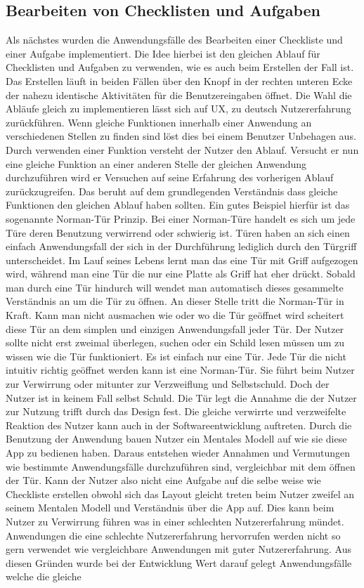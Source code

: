 \subsection{Bearbeiten von Checklisten und Aufgaben}\label{subsec:bearbeiten}

Als nächstes wurden die Anwendungsfälle des Bearbeiten einer Checkliste und einer Aufgabe implementiert. Die Idee hierbei ist den gleichen Ablauf für Checklisten und Aufgaben zu verwenden, wie es auch beim Erstellen der Fall ist. Das Erstellen läuft in beiden Fällen über den Knopf in der rechten unteren Ecke der nahezu identische Aktivitäten für die Benutzereingaben öffnet. Die Wahl die Abläufe gleich zu implementieren lässt sich auf \ac{UX}, zu deutsch Nutzererfahrung zurückführen. Wenn gleiche Funktionen innerhalb einer Anwendung an verschiedenen Stellen zu finden sind löst dies bei einem Benutzer Unbehagen aus. Durch verwenden einer Funktion versteht der Nutzer den Ablauf. Versucht er nun eine gleiche Funktion an einer anderen Stelle der gleichen Anwendung durchzuführen wird er Versuchen auf seine Erfahrung des vorherigen Ablauf zurückzugreifen. Das beruht auf dem grundlegenden Verständnis dass gleiche Funktionen den gleichen Ablauf haben sollten. Ein gutes Beispiel hierfür ist das sogenannte Norman-Tür Prinzip. Bei einer Norman-Türe handelt es sich um jede Türe deren Benutzung verwirrend oder schwierig ist. Türen haben an sich einen einfach Anwendungsfall der sich in der Durchführung lediglich durch den Türgriff unterscheidet. Im Lauf seines Lebens lernt man das eine Tür mit Griff aufgezogen wird, während man eine Tür die nur eine Platte als Griff hat eher drückt. Sobald man durch eine Tür hindurch will wendet man automatisch dieses gesammelte Verständnis an um die Tür zu öffnen. An dieser Stelle tritt die Norman-Tür in Kraft. Kann man nicht ausmachen wie oder wo die Tür geöffnet wird scheitert diese Tür an dem simplen und einzigen Anwendungsfall jeder Tür. Der Nutzer sollte nicht erst zweimal überlegen, suchen oder ein Schild lesen müssen um zu wissen wie die Tür funktioniert. Es ist einfach nur eine Tür. Jede Tür die nicht intuitiv richtig geöffnet werden kann ist eine Norman-Tür. Sie führt beim Nutzer zur Verwirrung oder mitunter zur Verzweiflung und Selbstschuld. Doch der Nutzer ist in keinem Fall selbst Schuld. Die Tür legt die Annahme die der Nutzer zur Nutzung trifft durch das Design fest. Die gleiche verwirrte und verzweifelte Reaktion des Nutzer kann auch in der Softwareentwicklung auftreten. Durch die Benutzung der Anwendung bauen Nutzer ein Mentales Modell auf wie sie diese App zu bedienen haben. Daraus entstehen wieder Annahmen und Vermutungen wie bestimmte Anwendungsfälle durchzuführen sind, vergleichbar mit dem öffnen der Tür. Kann der Nutzer also nicht eine Aufgabe auf die selbe weise wie Checkliste erstellen obwohl sich das Layout gleicht treten beim Nutzer zweifel an seinem Mentalen Modell und Verständnis über die App auf. Dies kann beim Nutzer zu Verwirrung führen was in einer schlechten Nutzererfahrung mündet. Anwendungen die eine schlechte Nutzererfahrung hervorrufen werden nicht so gern verwendet wie vergleichbare Anwendungen mit guter Nutzererfahrung. Aus diesen Gründen wurde bei der Entwicklung Wert darauf gelegt Anwendungsfälle welche die gleiche 